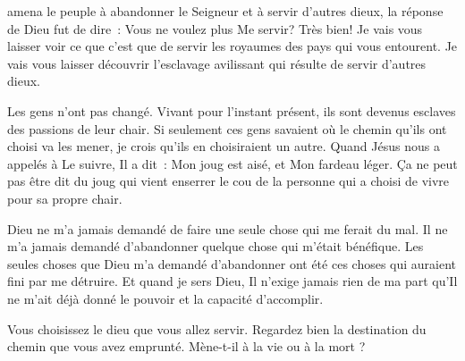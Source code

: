 \dvrule






 amena le peuple à abandonner le Seigneur
 et à servir d'autres dieux, la réponse de Dieu fut de dire~:
 \og Vous ne voulez plus Me servir? Très bien!
 Je vais vous laisser voir ce que c'est que de servir les royaumes
 des pays qui vous entourent. Je vais vous laisser découvrir l'esclavage
 avilissant qui résulte de servir d'autres dieux. \fg{}


Les gens n'ont pas changé. Vivant pour l'instant présent, ils sont devenus
 esclaves des passions de leur chair. Si seulement ces gens savaient
 où le chemin qu'ils ont choisi va les mener, je crois qu'ils en choisiraient
 un autre. Quand Jésus nous a appelés à Le suivre, Il a dit~:
 \og Mon joug est aisé, et Mon fardeau léger. \fg{}
 Ça ne peut pas être dit du joug qui vient enserrer le cou de la personne
 qui a choisi de vivre pour sa propre chair. 

Dieu ne m'a jamais demandé de faire une seule chose qui me ferait du mal.
 Il ne m'a jamais demandé d'abandonner quelque chose qui m'était bénéfique.
 Les seules choses que Dieu m'a demandé d'abandonner ont été ces choses
 qui auraient fini par me détruire. Et quand je sers Dieu,
 Il n'exige jamais rien de ma part qu'Il ne m'ait déjà donné le pouvoir
 et la capacité d'accomplir. 

Vous choisissez le dieu que vous allez servir. Regardez bien la destination
 du chemin que vous avez emprunté. Mène-t-il à la vie ou à la mort ? 

\dvrule





